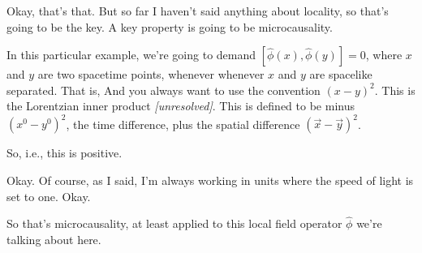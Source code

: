 Okay, that's that. But so far I haven't said anything about locality, so
that's going to be the key. A key property is going to be microcausality.

In this particular example, we're going to demand
$[\hat\phi(x),\hat\phi(y)]=0$, where $x$ and $y$ are two spacetime points,
whenever
whenever $x$ and $y$ are spacelike separated. That is,
And you always want to use the convention $(x-y)^2$. This is the Lorentzian
inner product \textit{[unresolved]}. This is defined to be minus
$(x^0-y^0)^2$, the time difference, plus the spatial difference
$(\vec x-\vec y)^2$.

So, i.e., this is positive.

Okay. Of course, as I said, I'm always working in units where the speed of
light is set to one. Okay.

So that's microcausality, at least applied to this local field operator
$\hat\phi$ we're talking about here.


